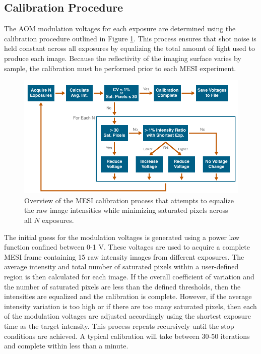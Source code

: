 \subsection{Calibration Procedure}

The AOM modulation voltages for each exposure are determined using the calibration procedure outlined in Figure \ref{fig:mesicalibration}. This process ensures that shot noise is held constant across all exposures by equalizing the total amount of light used to produce each image. Because the reflectivity of the imaging surface varies by sample, the calibration must be performed prior to each MESI experiment.

\begin{figure}
    \includegraphics{figures/chapter_4/mesicalibration.pdf}
    \caption{
        \label{fig:mesicalibration}
        Overview of the MESI calibration process that attempts to equalize the raw image intensities while minimizing saturated pixels across all $N$ exposures.
    }
\end{figure}

The initial guess for the modulation voltages is generated using a power law function confined between 0-1 V. These voltages are used to acquire a complete MESI frame containing 15 raw intensity images from different exposures. The average intensity and total number of saturated pixels within a user-defined region is then calculated for each image. If the overall coefficient of variation and the number of saturated pixels are less than the defined thresholds, then the intensities are equalized and the calibration is complete. However, if the average intensity variation is too high or if there are too many saturated pixels, then each of the modulation voltages are adjusted accordingly using the shortest exposure time as the target intensity. This process repeats recursively until the stop conditions are achieved. A typical calibration will take between 30-50 iterations and complete within less than a minute.

